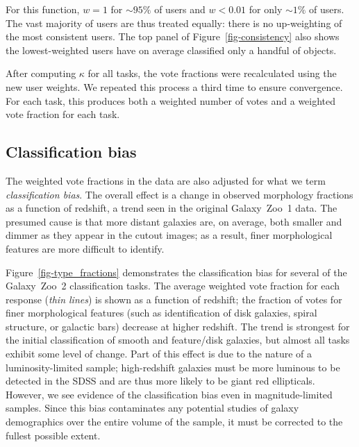 \documentclass[useAMS,usenatbib]{mn2e}
\begin{document}
\noindent For this function, $w=1$ for $\sim95\%$ of users and $w<0.01$ for only $\sim1\%$ of users. The vast majority of users are thus treated equally: there is no up-weighting of the most consistent users. The top panel of Figure~\ref{fig-consistency} also shows the lowest-weighted users have on average classified only a handful of objects.

After computing $\kappa$ for all tasks, the vote fractions were recalculated using the new user weights. We repeated this process a third time to ensure convergence. For each task, this produces both a weighted number of votes and a weighted vote fraction for each task. 

\subsection{Classification bias}\label{ssec-classificationbias}

The weighted vote fractions in the data are also adjusted for what we term {\it classification bias}. The overall effect is a change in observed morphology fractions as a function of redshift, a trend seen in the original Galaxy~Zoo~1 data. The presumed cause is that more distant galaxies are, on average, both smaller and dimmer as they appear in the cutout images; as a result, finer morphological features are more difficult to identify. 

Figure~\ref{fig-type_fractions} demonstrates the classification bias for several of the Galaxy~Zoo~2 classification tasks. The average weighted vote fraction for each response ({\it thin lines}) is shown as a function of redshift; the fraction of votes for finer morphological features (such as identification of disk galaxies, spiral structure, or galactic bars) decrease at higher redshift. The trend is strongest for the initial classification of smooth and feature/disk galaxies, but almost all tasks exhibit some level of change. Part of this effect is due to the nature of a luminosity-limited sample; high-redshift galaxies must be more luminous to be detected in the SDSS and are thus more likely to be giant red ellipticals. However, we see evidence of the classification bias even in magnitude-limited samples. Since this bias contaminates any potential studies of galaxy demographics over the entire volume of the sample, it must be corrected to the fullest possible extent. 
\end{document}
